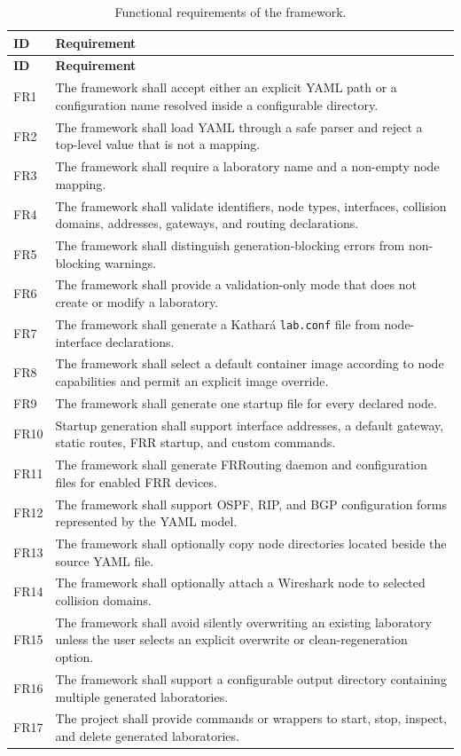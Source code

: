 \begin{longtable}{p{}p{}}
\caption{Functional requirements of the framework.}
\label{tab:functional-requirements}\\
\toprule
\textbf{ID} & \textbf{Requirement} \\
\midrule
\endfirsthead
\toprule
\textbf{ID} & \textbf{Requirement} \\
\midrule
\endhead
FR1 & The framework shall accept either an explicit YAML path or a configuration name resolved inside a configurable directory. \\
FR2 & The framework shall load YAML through a safe parser and reject a top-level value that is not a mapping. \\
FR3 & The framework shall require a laboratory name and a non-empty node mapping. \\
FR4 & The framework shall validate identifiers, node types, interfaces, collision domains, addresses, gateways, and routing declarations. \\
FR5 & The framework shall distinguish generation-blocking errors from non-blocking warnings. \\
FR6 & The framework shall provide a validation-only mode that does not create or modify a laboratory. \\
FR7 & The framework shall generate a Kathar\'a \texttt{lab.conf} file from node-interface declarations. \\
FR8 & The framework shall select a default container image according to node capabilities and permit an explicit image override. \\
FR9 & The framework shall generate one startup file for every declared node. \\
FR10 & Startup generation shall support interface addresses, a default gateway, static routes, FRR startup, and custom commands. \\
FR11 & The framework shall generate FRRouting daemon and configuration files for enabled FRR devices. \\
FR12 & The framework shall support OSPF, RIP, and BGP configuration forms represented by the YAML model. \\
FR13 & The framework shall optionally copy node directories located beside the source YAML file. \\
FR14 & The framework shall optionally attach a Wireshark node to selected collision domains. \\
FR15 & The framework shall avoid silently overwriting an existing laboratory unless the user selects an explicit overwrite or clean-regeneration option. \\
FR16 & The framework shall support a configurable output directory containing multiple generated laboratories. \\
FR17 & The project shall provide commands or wrappers to start, stop, inspect, and delete generated laboratories. \\
\bottomrule
\end{longtable}


